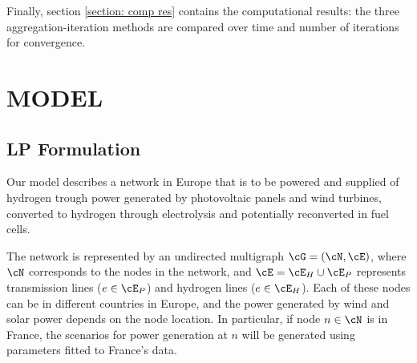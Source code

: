 Finally, section \ref{section: comp res} contains the computational results: the three aggregation-iteration methods are compared over time and number of iterations for convergence.












\section{MODEL}\label{section: model}

\subsection{LP Formulation}\label{subsection: LP}
Our model describes a network in Europe that is to be powered and supplied of hydrogen trough power generated by photovoltaic panels and wind turbines, converted to hydrogen through electrolysis and potentially reconverted in fuel cells.

The network is represented by an undirected multigraph \(\cG = (\cN, \cE)\), where \(\cN\) corresponds to the nodes in the network, and \(\cE = \cE_H \cup \cE_P\) represents transmission lines (\(e \in \cE_P\)) and hydrogen lines (\(e \in \cE_H\)).
Each of these nodes can be in different countries in Europe, and the power generated by wind and solar power depends on the node location. 
In particular, if node \(n \in \cN\) is in France, the scenarios for power generation at \(n\) will be generated using parameters fitted to France's data.

